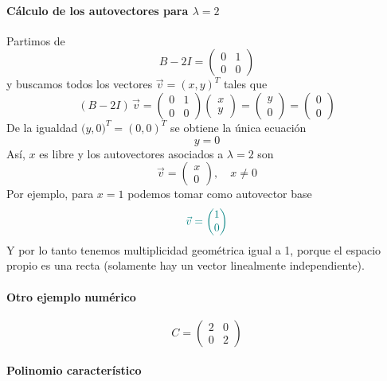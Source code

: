 \documentclass{article}
\newcommand{\vect}[1]{\vec{#1}}
\begin{document}
\paragraph*{Cálculo de los autovectores para \(\lambda=2\)}

Partimos de
\[
B - 2I = \begin{pmatrix}
0 & 1\\
0 & 0
\end{pmatrix}
\]
y buscamos todos los vectores \(\vect{v}=(x,y)^T\) tales que
\[
(B - 2I)\,\vect{v} = \begin{pmatrix}
0 & 1\\
0 & 0
\end{pmatrix}
\begin{pmatrix}x\\y\end{pmatrix}
= \begin{pmatrix}
y\\
0
\end{pmatrix}
= \begin{pmatrix}0\\0\end{pmatrix}
\]
De la igualdad \(\bigl(y,0\bigr)^T=(0,0)^T\) se obtiene la única ecuación
\[
y = 0
\]
Así, \(x\) es libre y los autovectores asociados a \(\lambda=2\) son
\[
\vect{v} = \begin{pmatrix}x\\0\end{pmatrix},
\quad x\neq 0
\]
Por ejemplo, para \(x=1\) podemos tomar como autovector base
\[
\color{teal}
\vect{v} = \begin{pmatrix}1\\0\end{pmatrix}
\]
Y por lo tanto tenemos multiplicidad geométrica igual a 1, porque el espacio propio es una recta (solamente hay un vector linealmente independiente).


\paragraph*{Otro ejemplo numérico}


\[
  C = \begin{pmatrix}
    2 & 0\\
    0 & 2
  \end{pmatrix}
\]

\paragraph*{Polinomio característico}
\end{document}

